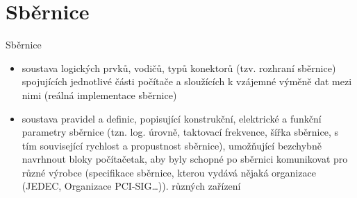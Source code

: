 \documentclass[aspectratio=43]{beamer}
\begin{document}
\section{Sběrnice}
\begin{frame}{Sběrnice}
	\begin{itemize}
		\item soustava logických prvků, vodičů, typů konektorů (tzv. rozhraní sběrnice) spojujících jednotlivé části počítače a sloužících k vzájemné výměně dat mezi nimi (reálná implementace sběrnice)
		\item soustava pravidel a definic, popisující konstrukční, elektrické a funkční parametry sběrnice (tzn. log. úrovně, taktovací frekvence, šířka sběrnice, s tím související rychlost a propustnost sběrnice),  umožňující bezchybně navrhnout bloky počítačetak, aby byly schopné po sběrnici komunikovat pro různé výrobce (specifikace sběrnice, kterou vydává nějaká organizace (JEDEC, Organizace PCI-SIG…)).
		      různých zařízení
	\end{itemize}
\end{frame}
\end{document}
